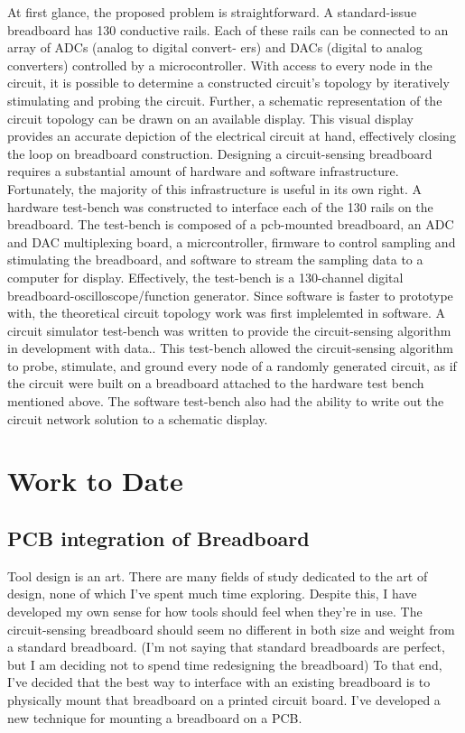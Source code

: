 \documentclass[11pt, a4paper]{article}
\begin{document}
At first glance, the proposed problem is straightforward. 
A standard-issue breadboard has 130 conductive rails. 
Each of these rails can be connected to an array of ADCs (analog to digital convert-
ers) and DACs (digital to analog converters) controlled by a microcontroller. 
With access to every node in the circuit, it is possible to determine a constructed circuit's topology by iteratively stimulating and probing the circuit. 
Further, a schematic representation of the circuit topology can be drawn on an available display.
This visual display provides an accurate depiction of the electrical circuit at hand, effectively closing the loop on breadboard construction.
Designing a circuit-sensing breadboard requires a substantial amount of hardware and software infrastructure. 
Fortunately, the majority of this infrastructure is useful in its own right. 
A hardware test-bench was constructed to interface each of the 130 rails on the breadboard. 
The test-bench is composed of a pcb-mounted breadboard, an ADC and DAC multiplexing board, a micrcontroller, firmware to control sampling and stimulating the breadboard, and software to stream the sampling data to a computer for display.
Effectively, the test-bench is a 130-channel digital breadboard-oscilloscope/function generator. 
Since software is faster to prototype with, the theoretical circuit topology work was first implelemted in software. 
A circuit simulator test-bench was written to provide the circuit-sensing algorithm in development with data.. 
This test-bench allowed the circuit-sensing algorithm to probe, stimulate, and ground every node of a randomly generated circuit, as if the circuit were built on a breadboard attached to the hardware test bench mentioned above.
The software test-bench also had the ability to write out the circuit network solution to a schematic display.

\section{Work to Date}
\subsection{PCB integration of Breadboard}

Tool design is an art.
There are many fields of study dedicated to the art of design, none of which I've spent much time exploring.
Despite this, I have developed my own sense for how tools should feel when they're in use.
The circuit-sensing breadboard should seem no different in both size and weight from a standard breadboard.
(I'm not saying that standard breadboards are perfect, but I am deciding not to spend time redesigning the breadboard)
To that end, I've decided that the best way to interface with an existing breadboard is to physically mount that breadboard on a printed circuit board.
I've developed a new technique for mounting a breadboard on a PCB.
\end{document}
